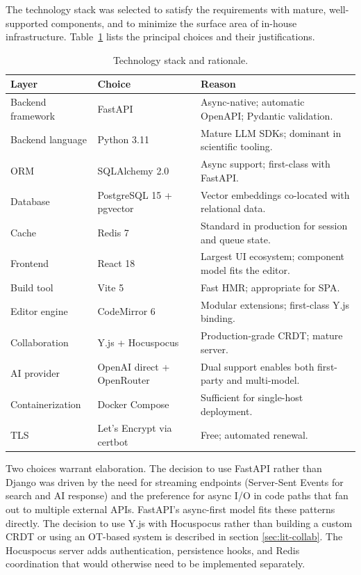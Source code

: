 The technology stack was selected to satisfy the requirements with mature, well-supported components, and to minimize the surface area of in-house infrastructure. Table~\ref{tab:stack} lists the principal choices and their justifications.

\begin{table}[h]
\centering
\caption{Technology stack and rationale.}
\label{tab:stack}
\small
\begin{tabularx}{\textwidth}{l l X}
\toprule
\textbf{Layer} & \textbf{Choice} & \textbf{Reason} \\
\midrule
Backend framework & FastAPI \cite{fastapi2024}      & Async-native; automatic OpenAPI; Pydantic validation. \\
Backend language  & Python 3.11                      & Mature LLM SDKs; dominant in scientific tooling. \\
ORM               & SQLAlchemy 2.0                   & Async support; first-class with FastAPI. \\
Database          & PostgreSQL 15 + pgvector \cite{pgvector2024} & Vector embeddings co-located with relational data. \\
Cache             & Redis 7                          & Standard in production for session and queue state. \\
Frontend          & React 18 \cite{react2024}        & Largest UI ecosystem; component model fits the editor. \\
Build tool        & Vite 5                           & Fast HMR; appropriate for SPA. \\
Editor engine     & CodeMirror 6 \cite{codemirror2024} & Modular extensions; first-class Y.js binding. \\
Collaboration     & Y.js + Hocuspocus \cite{yjs2024, hocuspocus2024} & Production-grade CRDT; mature server. \\
AI provider       & OpenAI direct + OpenRouter       & Dual support enables both first-party and multi-model. \\
Containerization  & Docker Compose                   & Sufficient for single-host deployment. \\
TLS               & Let's Encrypt via certbot        & Free; automated renewal. \\
\bottomrule
\end{tabularx}
\end{table}

Two choices warrant elaboration. The decision to use FastAPI rather than Django was driven by the need for streaming endpoints (Server-Sent Events for search and AI response) and the preference for async I/O in code paths that fan out to multiple external APIs. FastAPI's async-first model fits these patterns directly. The decision to use Y.js with Hocuspocus rather than building a custom CRDT or using an OT-based system is described in section \ref{sec:lit-collab}. The Hocuspocus server adds authentication, persistence hooks, and Redis coordination that would otherwise need to be implemented separately.

